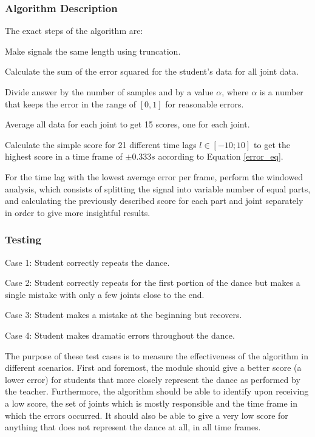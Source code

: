 \documentclass[11pt,a4paper]{article}
\begin{document}
\subsubsection{Algorithm Description}
\noindent
 The exact steps of the algorithm are:
\begin{compactitem}
\setlength{\itemsep}{1pt}
\setlength{\parskip}{0pt}
\setlength{\parsep}{0pt}
	\item Make signals the same length using truncation.
	\item Calculate the sum of the error squared for the student's data for all joint data.
	\item Divide answer by the number of samples and by a value $\alpha$, where $\alpha$ is a number that keeps the error in the range of $[0, 1]$ for reasonable errors. 
	\item Average all data for each joint to get 15 scores, one for each joint.
	\item Calculate the simple score for 21 different time lags $l \in [-10;10]$ to get the highest score in a time frame of $\pm 0.333s$
 according to Equation \eqref{error_eq}.
	\item For the time lag with the lowest average error per frame, perform the windowed analysis, which consists of splitting the signal into variable number of equal parts, and calculating the previously described score for each part and joint separately in order to give more insightful results. 
\end{compactitem}
\subsubsection{Testing}
\begin{compactitem}
\item{Case 1: Student correctly repeats the dance.}
\item{Case 2: Student correctly repeats for the first portion of the dance but makes a single mistake with only a few joints close to the end.}
\item{Case 3: Student makes a mistake at the beginning but recovers.}
\item{Case 4: Student makes dramatic errors throughout the dance.}
\end{compactitem}

\noindent
The purpose of these test cases is to measure the effectiveness of the algorithm in different scenarios. First and foremost, the module should give a better score (a lower error) for students that more closely represent the dance as performed by the teacher. Furthermore, the algorithm should be able to identify upon receiving a low score,  the set of joints which is mostly responsible and the time frame in which the errors occurred. It should also be able to give a very low score for anything that does not represent the dance at all, in all time frames.
\end{document}
